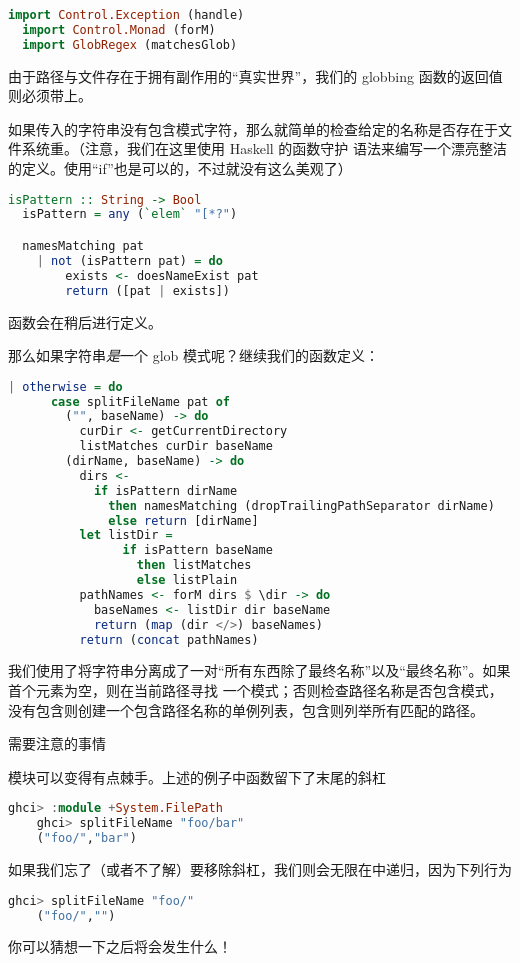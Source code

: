 \documentclass[./main.tex]{subfiles}
\begin{document}
\begin{lstlisting}[language=Haskell]
  import Control.Exception (handle)
  import Control.Monad (forM)
  import GlobRegex (matchesGlob)
\end{lstlisting}

由于路径与文件存在于拥有副作用的“真实世界”，我们的 globbing 函数的返回值则必须带上。

如果传入的字符串没有包含模式字符，那么就简单的检查给定的名称是否存在于文件系统重。（注意，我们在这里使用 Haskell 的函数守护
语法来编写一个漂亮整洁的定义。使用“if”也是可以的，不过就没有这么美观了）

\begin{lstlisting}[language=Haskell]
  isPattern :: String -> Bool
  isPattern = any (`elem` "[*?")

  namesMatching pat
    | not (isPattern pat) = do
        exists <- doesNameExist pat
        return ([pat | exists])
\end{lstlisting}

函数会在稍后进行定义。

那么如果字符串\textit{是}一个 glob 模式呢？继续我们的函数定义：

\begin{lstlisting}[language=Haskell]
  | otherwise = do
      case splitFileName pat of
        ("", baseName) -> do
          curDir <- getCurrentDirectory
          listMatches curDir baseName
        (dirName, baseName) -> do
          dirs <-
            if isPattern dirName
              then namesMatching (dropTrailingPathSeparator dirName)
              else return [dirName]
          let listDir =
                if isPattern baseName
                  then listMatches
                  else listPlain
          pathNames <- forM dirs $ \dir -> do
            baseNames <- listDir dir baseName
            return (map (dir </>) baseNames)
          return (concat pathNames)
\end{lstlisting}

我们使用了将字符串分离成了一对“所有东西除了最终名称”以及“最终名称”。如果首个元素为空，则在当前路径寻找
一个模式；否则检查路径名称是否包含模式，没有包含则创建一个包含路径名称的单例列表，包含则列举所有匹配的路径。

\begin{anote}
  需要注意的事情

  模块可以变得有点棘手。上述的例子中函数留下了末尾的斜杠

  \begin{lstlisting}[language=Haskell]
    ghci> :module +System.FilePath
    ghci> splitFileName "foo/bar"
    ("foo/","bar")
  \end{lstlisting}

  如果我们忘了（或者不了解）要移除斜杠，我们则会无限在中递归，因为下列行为

  \begin{lstlisting}[language=Haskell]
    ghci> splitFileName "foo/"
    ("foo/","")
  \end{lstlisting}

  你可以猜想一下之后将会发生什么！
\end{anote}
\end{document}
